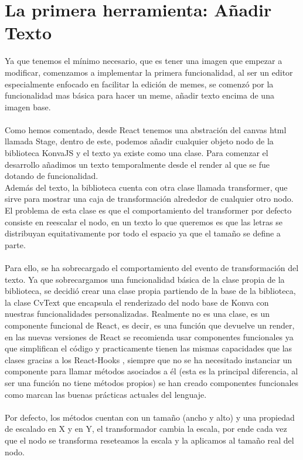 \section{La primera herramienta: Añadir Texto}
Ya que tenemos el mínimo necesario, que es tener una imagen que empezar a modificar, 
comenzamos a implementar la primera funcionalidad, al ser un editor especialmente
enfocado en facilitar la edición de memes, se comenzó por la funcionalidad mas básica
para hacer un meme, añadir texto encima de una imagen base.
\\\\
Como hemos comentado, desde React tenemos una abstración del canvas html llamada Stage,
dentro de este, podemos añadir cualquier objeto nodo de la biblioteca KonvaJS y el texto
ya existe como una clase. Para comenzar el desarrollo añadimos un texto temporalmente
desde el render al que se fue dotando de funcionalidad.
\\
Además del texto, la biblioteca cuenta con otra clase llamada transformer, que sirve 
para mostrar una caja de transformación alrededor de cualquier otro nodo. El problema
de esta clase es que el comportamiento del transformer por defecto consiste en 
reescalar el nodo, en un texto lo que queremos es que las letras se distribuyan
equitativamente por todo el espacio ya que el tamaño se define a parte.
\\\\
Para ello, se ha sobrecargado el comportamiento del evento de transformación del texto.
Ya que sobrecargamos una funcionalidad básica de la clase propia de la biblioteca, se 
decidió crear una clase propia partiendo de la base de la biblioteca, la clase CvText
que encapsula el renderizado del nodo base de Konva con nuestras funcionalidades personalizadas.
Realmente no es una clase, es un componente funcional de React, es decir, es una 
función que devuelve un render, en las nuevas versiones de React se recomienda usar
componentes funcionales ya que simplifican el código y practicamente tienen las mismas
capacidades que las clases gracias a los React-Hooks \cite{React-Hooks}, siempre que 
no se ha necesitado instanciar un componente para llamar métodos asociados a él 
(esta es la principal diferencia, al ser una función no tiene métodos propios) se han
creado componentes funcionales como marcan las buenas prácticas actuales del lenguaje.
\\\\
Por defecto, los métodos cuentan con un tamaño (ancho y alto) y una propiedad de escalado
en X y en Y, el transformador cambia la escala, por ende cada vez que el nodo se transforma
reseteamos la escala y la aplicamos al tamaño real del nodo. 

